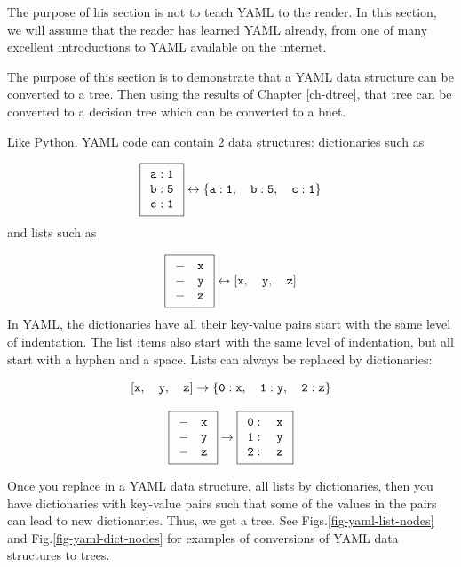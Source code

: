 The purpose of his section is not to teach
YAML to the reader.
In this section, we will
assume that the reader has learned YAML already,
from one of many excellent introductions to YAML
available on the internet.


The purpose of this section is to
demonstrate that a YAML data structure can be converted to
a tree. Then using
the results of Chapter \ref{ch-dtree}, that tree can be converted to a decision tree which can be converted to a bnet.

Like Python, YAML code 
can contain 2 data structures: dictionaries
such as 

$$\boxed{\begin{array}{l}
{\tt a:1}\\
{\tt b:5}\\
{\tt c:1}
\end{array}}
\leftrightarrow
{\tt \{a:1,\quad b:5,\quad c:1\}} 
$$
and lists such as

$$
\boxed{
\begin{array}{l}
{\tt - \quad x}\\
{\tt -\quad y}\\
{\tt -\quad z}
\end{array}}
\leftrightarrow
{\tt [x,\quad y,\quad z]}
$$
In YAML, the dictionaries
have all their key-value
pairs start with the same level of indentation.
The list items also start with
the same level of indentation, but all start with a hyphen and a space.
Lists can always be replaced by dictionaries:

$${\tt [x,\quad y,\quad z] \rightarrow
\{0:x, \quad 1:y,\quad 2:z\}}
$$

$$
\boxed{
\begin{array}{l}
{\tt - \quad x}\\
{\tt -\quad y}\\
{\tt -\quad z}
\end{array}}
\rightarrow
\boxed{
\begin{array}{l}
{\tt 0: \quad x}\\
{\tt 1: \quad y}\\
{\tt 2:\quad z}
\end{array}}
$$

Once you replace in
a YAML data structure, all lists
by dictionaries,
then you have dictionaries 
with key-value pairs such that
some of the values in the pairs can lead to new dictionaries. Thus, we get a tree. See Figs.\ref{fig-yaml-list-nodes}
and Fig.\ref{fig-yaml-dict-nodes}
for examples of conversions
of YAML data structures to trees.


